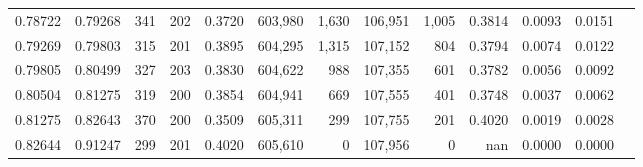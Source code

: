 \begin{tabular}{rrrrrrrrrrrrr}
0.78722 & 0.79268 &   341 & 202 &                                     0.3720 & 603,980 &   1,630 & 106,951 &   1,005 & 0.3814 & 0.0093 & 0.0151 \\
0.79269 & 0.79803 &   315 & 201 &                                     0.3895 & 604,295 &   1,315 & 107,152 &     804 & 0.3794 & 0.0074 & 0.0122 \\
0.79805 & 0.80499 &   327 & 203 &                                     0.3830 & 604,622 &     988 & 107,355 &     601 & 0.3782 & 0.0056 & 0.0092 \\
0.80504 & 0.81275 &   319 & 200 &                                     0.3854 & 604,941 &     669 & 107,555 &     401 & 0.3748 & 0.0037 & 0.0062 \\
0.81275 & 0.82643 &   370 & 200 &                                     0.3509 & 605,311 &     299 & 107,755 &     201 & 0.4020 & 0.0019 & 0.0028 \\
0.82644 & 0.91247 &   299 & 201 &                                     0.4020 & 605,610 &       0 & 107,956 &       0 &    nan & 0.0000 & 0.0000 \\
\bottomrule
\end{tabular}
